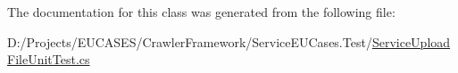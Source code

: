 The documentation for this class was generated from the following file\-:\begin{DoxyCompactItemize}
\item 
D\-:/\-Projects/\-E\-U\-C\-A\-S\-E\-S/\-Crawler\-Framework/\-Service\-E\-U\-Cases.\-Test/\hyperlink{_service_upload_file_unit_test_8cs}{Service\-Upload\-File\-Unit\-Test.\-cs}\end{DoxyCompactItemize}
